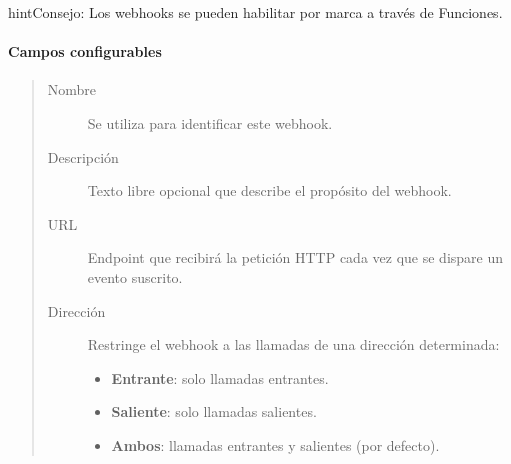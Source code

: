 \documentclass[letterpaper,10pt,spanish]{sphinxmanual}
\begin{document}
\begin{notice}{hint}{Consejo:}
Los webhooks se pueden habilitar por marca a través de Funciones.
\end{notice}


\paragraph{Campos configurables}
\label{administration_portal/client/vpbx/calls/webhooks:configurable-fields}\begin{quote}
\begin{description}
\item[{Nombre}] \leavevmode
Se utiliza para identificar este webhook.

\item[{Descripción}] \leavevmode
Texto libre opcional que describe el propósito del webhook.

\item[{URL}] \leavevmode
Endpoint que recibirá la petición HTTP  cada vez que se dispare un evento suscrito.

\item[{Dirección}] \leavevmode
Restringe el webhook a las llamadas de una dirección determinada:
\begin{itemize}
\item {} 
\textbf{Entrante}: solo llamadas entrantes.

\item {} 
\textbf{Saliente}: solo llamadas salientes.

\item {} 
\textbf{Ambos}: llamadas entrantes y salientes (por defecto).

\end{itemize}

\end{description}
\end{quote}
\end{document}

